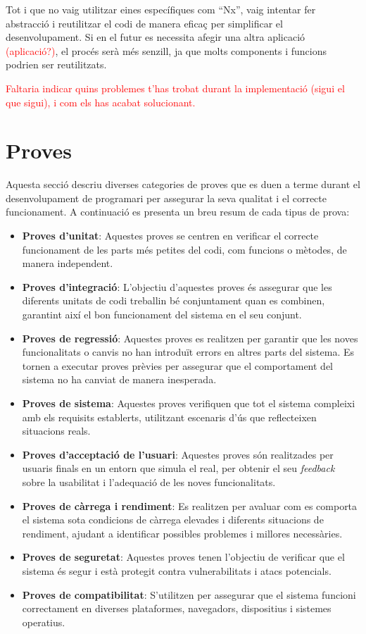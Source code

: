 \documentclass[a4paper,12pt,twoside]{ThesisStyle}
\newcommand{\pau}[1]{\textcolor{red}{#1}}
\begin{document}
Tot i que no vaig utilitzar eines específiques com ``Nx'', vaig intentar fer abstracció i reutilitzar el codi de manera eficaç per simplificar el desenvolupament. Si en el futur es necessita afegir una altra aplicació \pau{(aplicació?)}, el procés serà més senzill, ja que molts components i funcions podrien ser reutilitzats.

\pau{Faltaria indicar quins problemes t'has trobat durant la implementació (sigui el que sigui), i com els has acabat solucionant.}


\section{Proves}
\label{sec: Proves}

Aquesta secció descriu diverses categories de proves que es duen a terme durant el desenvolupament de programari per assegurar la seva qualitat i el correcte funcionament. A continuació es presenta un breu resum de cada tipus de prova:

\begin{itemize}
\item \textbf{Proves d'unitat}: Aquestes proves se centren en verificar el correcte funcionament de les parts més petites del codi, com funcions o mètodes, de manera independent.
\item \textbf{Proves d'integració}: L'objectiu d'aquestes proves és assegurar que les diferents unitats de codi treballin bé conjuntament quan es combinen, garantint així el bon funcionament del sistema en el seu conjunt.
\item \textbf{Proves de regressió}: Aquestes proves es realitzen per garantir que les noves funcionalitats o canvis no han introduït errors en altres parts del sistema. Es tornen a executar proves prèvies per assegurar que el comportament del sistema no ha canviat de manera inesperada.
\item \textbf{Proves de sistema}: Aquestes proves verifiquen que tot el sistema compleixi amb els requisits establerts, utilitzant escenaris d'ús que reflecteixen situacions reals.
\item \textbf{Proves d'acceptació de l'usuari}: Aquestes proves són realitzades per usuaris finals en un entorn que simula el real, per obtenir el seu \textit{feedback} sobre la usabilitat i l'adequació de les noves funcionalitats.
\item \textbf{Proves de càrrega i rendiment}: Es realitzen per avaluar com es comporta el sistema sota condicions de càrrega elevades i diferents situacions de rendiment, ajudant a identificar possibles problemes i millores necessàries.
\item \textbf{Proves de seguretat}: Aquestes proves tenen l'objectiu de verificar que el sistema és segur i està protegit contra vulnerabilitats i atacs potencials.
\item \textbf{Proves de compatibilitat}: S'utilitzen per assegurar que el sistema funcioni correctament en diverses plataformes, navegadors, dispositius i sistemes operatius.
\end{itemize}
\end{document}
